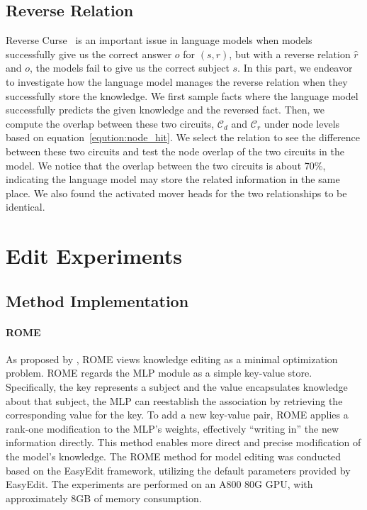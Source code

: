 \subsection{Reverse Relation}
\label{app:reverse_relation}
Reverse Curse~\cite{berglund2024the} is an important issue in language models when models successfully give us the correct answer $o$ for $(s,r)$, but with a reverse relation $\hat{r}$ and $o$, the models fail to give us the correct subject $s$.
In this part, we endeavor to investigate how the language model manages the reverse relation when they successfully store the knowledge.
We first sample facts where the language model successfully predicts the given knowledge and the reversed fact.
Then, we compute the overlap between these two circuits, $\mathcal{C}_{d}$ and $\mathcal{C}_{r}$ under node levels based on equation~\ref{eqution:node_hit}.
We select the  relation to see the difference between these two circuits and test the node overlap of the two circuits in the model.
We notice that the overlap between the two circuits is about 70\%, indicating the language model may store the related information in the same place.
We also found the activated mover heads for the two relationships to be identical.


\section{Edit Experiments}
\label{app:edit_experiments}
\subsection{Method Implementation}
\paragraph{ROME}
As proposed by \citet{meng2022locating}, ROME views knowledge editing as a minimal optimization problem. 
ROME regards the MLP module as a simple key-value store.
Specifically, the key represents a subject and the value encapsulates knowledge about that subject, the MLP can reestablish the association by retrieving the corresponding value for the key.
To add a new key-value pair, ROME applies a rank-one modification to the MLP's weights, effectively ``writing in'' the new information directly. 
This method enables more direct and precise modification of the model's knowledge. 
The ROME method for model editing was conducted based on the EasyEdit\cite{wang2023easyedit} framework, utilizing the default parameters provided by EasyEdit. 
The experiments are performed on an A800 80G GPU, with approximately 8GB of memory consumption.
\label{append:res}
